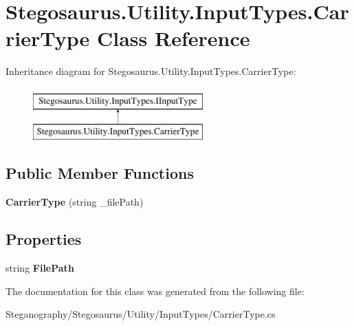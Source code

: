 \hypertarget{class_stegosaurus_1_1_utility_1_1_input_types_1_1_carrier_type}{}\section{Stegosaurus.\+Utility.\+Input\+Types.\+Carrier\+Type Class Reference}
\label{class_stegosaurus_1_1_utility_1_1_input_types_1_1_carrier_type}
Inheritance diagram for Stegosaurus.\+Utility.\+Input\+Types.\+Carrier\+Type\+:\begin{figure}[H]
\begin{center}
\leavevmode
\includegraphics[height=2.000000cm]{class_stegosaurus_1_1_utility_1_1_input_types_1_1_carrier_type}
\end{center}
\end{figure}
\subsection*{Public Member Functions}
\begin{DoxyCompactItemize}
\item 
{\bfseries Carrier\+Type} (string \+\_\+file\+Path)\hypertarget{class_stegosaurus_1_1_utility_1_1_input_types_1_1_carrier_type_a10e94c9805a3fe2f6e076de6eaa966bf}{}\label{class_stegosaurus_1_1_utility_1_1_input_types_1_1_carrier_type_a10e94c9805a3fe2f6e076de6eaa966bf}

\end{DoxyCompactItemize}
\subsection*{Properties}
\begin{DoxyCompactItemize}
\item 
string {\bfseries File\+Path}\hypertarget{class_stegosaurus_1_1_utility_1_1_input_types_1_1_carrier_type_aecf43bad73d78ed8ee181af8bdf0a323}{}\label{class_stegosaurus_1_1_utility_1_1_input_types_1_1_carrier_type_aecf43bad73d78ed8ee181af8bdf0a323}

\end{DoxyCompactItemize}


The documentation for this class was generated from the following file\+:\begin{DoxyCompactItemize}
\item 
Steganography/\+Stegosaurus/\+Utility/\+Input\+Types/Carrier\+Type.\+cs\end{DoxyCompactItemize}

